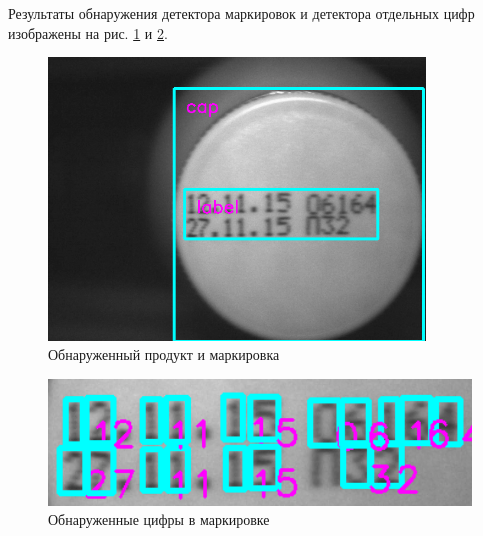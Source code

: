 Результаты обнаружения детектора маркировок и детектора отдельных цифр изображены на рис. \ref{fig:product_detect}  и \ref{fig:numbers_detect}.

\begin{figure}[!ht]
	\centering
	\includegraphics[width=10cm]{man-source/images/ch4/pic4-25.png}
	\caption{Обнаруженный продукт и маркировка}
	\label{fig:product_detect}
\end{figure}

\begin{figure}[!ht]
	\centering
	\includegraphics[width=12cm]{man-source/images/ch4/pic4-26.png}
	\caption{Обнаруженные цифры в маркировке}
	\label{fig:numbers_detect}
\end{figure}



